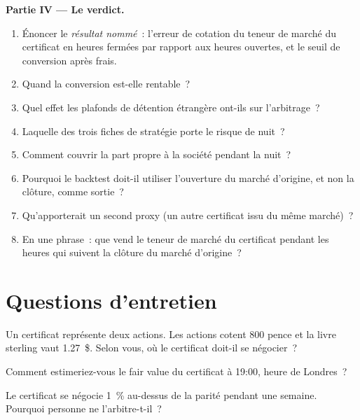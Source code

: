 \begin{problem}
\medskip\noindent\textbf{Partie IV --- Le verdict.}
\begin{enumerate}[resume]
\item Énoncer le \emph{résultat nommé}~: l'erreur de cotation du teneur de marché du certificat en heures fermées par rapport aux heures ouvertes, et le seuil de conversion après
frais.
\item Quand la conversion est-elle rentable~?
\item Quel effet les plafonds de détention étrangère ont-ils sur l'arbitrage~?
\item Laquelle des trois fiches de stratégie porte le risque de nuit~?
\item Comment couvrir la part propre à la société pendant la nuit~?
\item Pourquoi le backtest doit-il utiliser l'ouverture du marché d'origine, et non la clôture, comme sortie~?
\item Qu'apporterait un second proxy (un autre certificat issu du même marché)~?
\item En une phrase~: que vend le teneur de marché du certificat pendant les heures qui suivent la clôture du marché d'origine~?
\end{enumerate}
\end{problem}

\section{Questions d'entretien}

\begin{interviewq}\label{iq:hf:depositary-receipts-and-dual-listings:1}
Un certificat représente deux actions. Les actions cotent 800 pence et la livre sterling vaut 1.27~\$. Selon vous, où le certificat doit-il se négocier~?
\end{interviewq}

\begin{interviewq}\label{iq:hf:depositary-receipts-and-dual-listings:2}
Comment estimeriez-vous le fair value du certificat à 19:00, heure de Londres~?
\end{interviewq}

\begin{interviewq}\label{iq:hf:depositary-receipts-and-dual-listings:3}
Le certificat se négocie 1~\% au-dessus de la parité pendant une semaine. Pourquoi personne ne l'arbitre-t-il~?
\end{interviewq}

